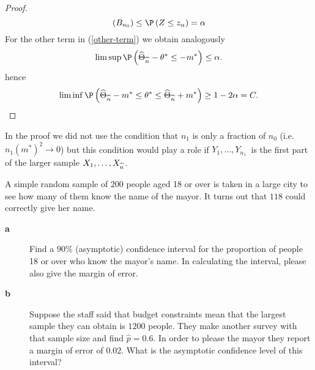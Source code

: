 \begin{proof}
\begin{equation*}
\left( B_{n_{0}}\right) \leq \P \left( Z\leq z_{\alpha}\right)
=\alpha
\end{equation*}%
For the other term in (\ref{other-term}) we obtain analogously 
\begin{equation*}
\limsup \P \left( \widehat{\Theta}_{\widehat{n}}-\theta^*\leq -m^{\ast }\right) \leq \alpha .
\end{equation*}%
hence 
\begin{equation*}
\liminf \P \left( \widehat{\Theta}_{\widehat{n}}-m^{\ast }\leq \theta^*\leq \widehat{\Theta}_{\widehat{n}%
}+m^{\ast }\right) \geq 1-2\alpha =C.
\end{equation*}
\end{proof}


\begin{rem}
In the proof we did not use the condition that $n_{1}$ is
only a fraction of $n_{0}$ (i.e. $n_{1}\left( m^{\ast }\right)
^{2}\rightarrow 0$) but this condition would play a role if $Y_{1},\ldots
,Y_{n_{1}}$\emph{\ }is the first part of the larger sample $X_{1},\ldots ,X_{%
\widehat{n}}$.
\end{rem}

\begin{Exercise}[label={ExNameOfMayorPoll}]
A simple random sample of 200 people aged 18 or over
is taken in a large city to see how many of them know the name of the mayor.
It turns out that $118$ could correctly give her name.

\begin{description}
\item[\textbf{a}] Find a $90\%$ (asymptotic) confidence interval for the
proportion of people 18 or over who know the mayor's name. In calculating
the interval, please also give the margin of error.


\item[\textbf{b}] Suppose the staff said that budget constraints mean that
the largest sample they can obtain is $1200$ people. They make another
survey with that sample size and find $\widehat{p}=0.6$. In order to please the
mayor they report a margin of error of $0.02$. What is the asymptotic
confidence level of this interval?
\end{description}
\end{Exercise}

\remove{
}
